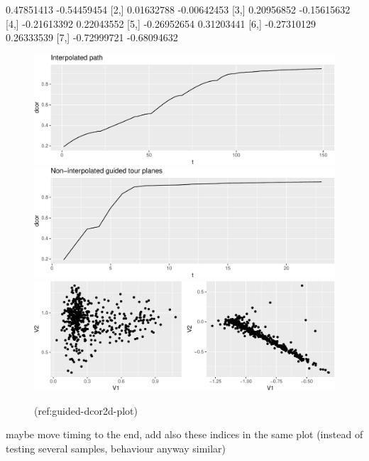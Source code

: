 \documentclass[article]{jss}
\begin{document}
\begin{CodeChunk}

\begin{CodeOutput}
            [,1]        [,2]
[1,]  0.47851413 -0.54459454
[2,]  0.01632788 -0.00642453
[3,]  0.20956852 -0.15615632
[4,] -0.21613392  0.22043552
[5,] -0.26952654  0.31203441
[6,] -0.27310129  0.26333539
[7,] -0.72999721 -0.68094632
\end{CodeOutput}
\begin{figure}

{\centering \includegraphics[width=\textwidth]{figure/guided-dcor2d-plot-1} \includegraphics[width=\textwidth]{figure/guided-dcor2d-plot-2} \includegraphics[width=\textwidth]{figure/guided-dcor2d-plot-3} 

}

\caption[(ref:guided-dcor2d-plot)]{(ref:guided-dcor2d-plot)}\label{fig:guided-dcor2d-plot}
\end{figure}
\end{CodeChunk}

maybe move timing to the end, add also these indices in the same plot
(instead of testing several samples, behaviour anyway similar)
\end{document}
